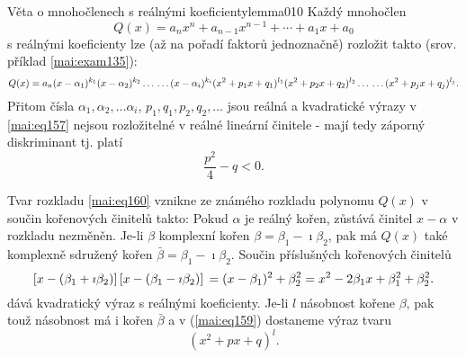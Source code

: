       \begin{mathlemma}{Věta o mnohočlenech s reálnými koeficienty}{lemma010}
        Každý mnohočlen
        \begin{equation*}
          Q(x) = a_nx^n + a_{n-1}x^{n-1} + \cdots + a_1x + a_0
        \end{equation*}
        s reálnými koeficienty lze (až na pořadí faktorů jednoznačně) rozložit takto (srov.
        příklad \ref{mai:exam135}):
        \begin{equation}\label{mai:eq159}
          Q(x) = a_n(x-\alpha_1)^{k_1}(x-\alpha_2)^{k_2}\ldots                   \notag \\
          \ldots(x-\alpha_i)^{k_i}(x^2+p_1x+q_1)^{l_1}(x^2+p_2x+q_2)^{l_2}\ldots \notag \\ 
          \ldots(x^2+p_jx+q_j)^{l_j}.
        \end{equation}
        Přitom čísla \(\alpha_1, \alpha_2, \ldots \alpha_i\), \(p_1, q_1, p_2, q_2, \ldots \) jsou
        reálná a kvadratické výrazy v \ref{mai:eq157} nejsou rozložitelné v reálné lineární
        činitele - mají tedy záporný diskriminant tj. platí
        \begin{equation}\label{mai:eq160}
          \frac{p^2}{4}-q<0.
        \end{equation} 
      \end{mathlemma}


      Tvar rozkladu \ref{mai:eq160} vznikne ze známého rozkladu polynomu \(Q(x)\) v součin
      kořenových činitelů takto: Pokud \(\alpha\) je reálný kořen, zůstává činitel \(x-\alpha\) v
      rozkladu nezměněn. Je-li \(\beta\) komplexní kořen \(\beta = \beta_1-\imath\beta_2\), pak má
      \(Q(x)\) také komplexně sdružený kořen \(\bar{\beta} = \beta_1-\imath\beta_2\). Součin
      příslušných kořenových činitelů
      \begin{equation}\label{mai:eq161}
        \left[x-(\beta_1+\imath\beta_2)\right]  
        \left[x-(\beta_1-\imath\beta_2)\right]                                     \notag \\
        = (x-\beta_1)^2+\beta^2_2 = x^2-2\beta_1x + \beta^2_1+\beta^2_2. 
      \end{equation}
      dává kvadratický výraz s reálnými koeficienty. Je-li \(l\) násobnost kořene \(\beta\), pak
      touž násobnost má i kořen \(\bar{\beta}\) a v (\ref{mai:eq159}) dostaneme výraz tvaru
      \begin{equation*}
        (x^2+px+q)^l.
      \end{equation*}

